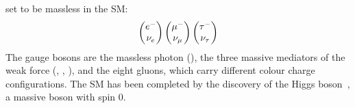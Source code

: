 set to be massless in the SM:
\begin{align}
\begin{pmatrix}
{\ensuremath{e^-}} \\ {{\nu}_e}
\end{pmatrix}
\begin{pmatrix}
{\ensuremath{\mu^-}} \\ {{\nu}_\mu}
\end{pmatrix}
\begin{pmatrix}
{\ensuremath{\tau^-}} \\ {{\nu}_\tau}
\end{pmatrix}
\end{align}
The gauge bosons are the massless photon (\g), the three massive mediators of
the weak force (\Wp, \Wm, \Z), and the eight gluons, which carry different
colour charge configurations. The SM has been completed by the discovery of
the Higgs boson~\cite{Higgs-Atlas,Higgs-CMS}, a massive boson with spin 0.

